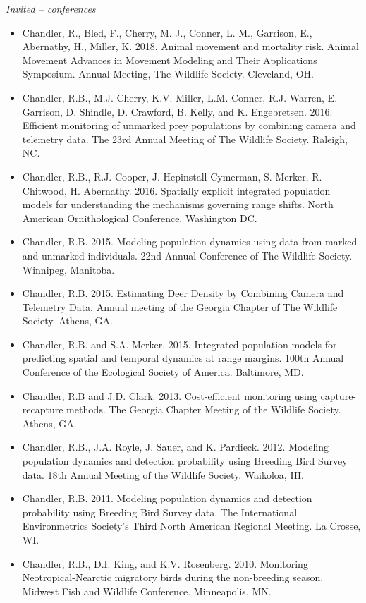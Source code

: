 \documentclass[12pt]{article}
\begin{document}
\emph{Invited -- conferences}

\begin{itemize}

\item Chandler, R., Bled, F., Cherry, M. J., Conner, L. M., Garrison,
  E., Abernathy, H., Miller, K. 2018. Animal movement and mortality
  risk. Animal Movement Advances in Movement Modeling and Their
  Applications Symposium. Annual Meeting, The Wildlife
  Society. Cleveland, OH. 
  
\item Chandler, R.B., M.J. Cherry, K.V. Miller, L.M. Conner,
  R.J. Warren, E. Garrison, D. Shindle, D. Crawford, B. Kelly, and K. 
  Engebretsen. 2016. Efficient monitoring of unmarked prey populations
  by combining camera and telemetry data. The 23rd Annual Meeting of
  The Wildlife Society. Raleigh, NC.

\item Chandler, R.B., R.J. Cooper, J. Hepinstall-Cymerman, S. Merker, R.
  Chitwood, H. Abernathy. 2016. Spatially explicit integrated
  population models for understanding the mechanisms governing range
  shifts. North American Ornithological Conference, Washington DC. 

\item Chandler, R.B. 2015. Modeling population dynamics using data
  from marked and unmarked individuals. 22nd Annual Conference of The
  Wildlife Society. Winnipeg, Manitoba.

\item Chandler, R.B. 2015. Estimating Deer Density by Combining Camera
  and Telemetry Data. Annual meeting of the Georgia Chapter of The
  Wildlife Society. Athens, GA.

\item Chandler, R.B. and S.A. Merker. 2015. Integrated population
  models for predicting spatial and temporal dynamics at range
  margins. 100th Annual Conference of the Ecological Society of
  America. Baltimore, MD. 

\item Chandler, R.B and J.D. Clark. 2013. Cost-efficient monitoring
  using capture-recapture methods. The Georgia Chapter Meeting of the
  Wildlife Society. Athens, GA.

\item Chandler, R.B., J.A. Royle, J. Sauer, and
  K. Pardieck. 2012. Modeling population dynamics and detection
  probability using Breeding Bird Survey data. 18th Annual Meeting of
  the Wildlife Society. Waikoloa, HI.

\item Chandler, R.B. 2011. Modeling population dynamics and detection
  probability using Breeding Bird Survey data. The International
  Environmetrics Society's Third North
  American Regional Meeting. La Crosse, WI.

\item Chandler, R.B., D.I. King, and K.V. Rosenberg. 2010. Monitoring
  Neotropical-Nearctic migratory birds during the non-breeding
  season. Midwest Fish and Wildlife Conference. Minneapolis, MN.

\end{itemize}
\end{document}

